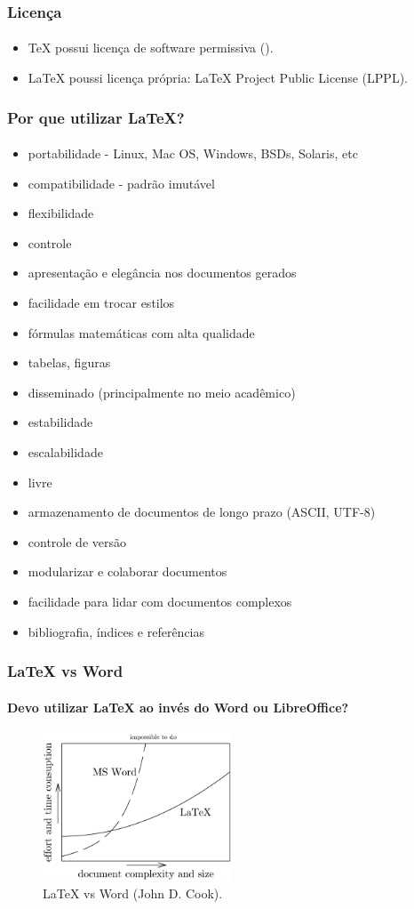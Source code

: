 \begin{frame}
\frametitle{Licença}
\framesubtitle{}
\begin{itemize}
  \item \TeX{} possui licença de software permissiva ().
  \item \LaTeX{} poussi licença própria: \LaTeX{} Project Public License (LPPL).
\end{itemize}
\end{frame}
\begin{frame}[allowframebreaks]
\frametitle{Por que utilizar \LaTeX{}?}
\framesubtitle{}
\begin{itemize}
  \item portabilidade - Linux, Mac OS, Windows, BSDs, Solaris, etc
  \item compatibilidade - padrão imutável
  \item flexibilidade
  \item controle
  \item apresentação e elegância nos documentos gerados
  \item facilidade em trocar estilos
  \item fórmulas matemáticas com alta qualidade
  \item tabelas, figuras
  \item disseminado (principalmente no meio acadêmico)
  \item estabilidade
  \item escalabilidade
  \item livre
  \item armazenamento de documentos de longo prazo (ASCII, UTF-8)
  \item controle de versão
  \item modularizar e colaborar documentos
  \item facilidade para lidar com documentos complexos
  \item bibliografia, índices e referências
\end{itemize}
\end{frame}


\begin{frame}
\frametitle{\LaTeX{} vs Word}
\framesubtitle{Devo utilizar \LaTeX{} ao invés do Word ou LibreOffice?}
  \begin{figure}[h!]
  \centering
  \includegraphics[width=0.5\textwidth]{figures/word_vs_latex.png}
  \caption{\LaTeX{} vs Word (John D. Cook).}
  \label{fig:word_vs_latex}
  \end{figure}
\end{frame}


